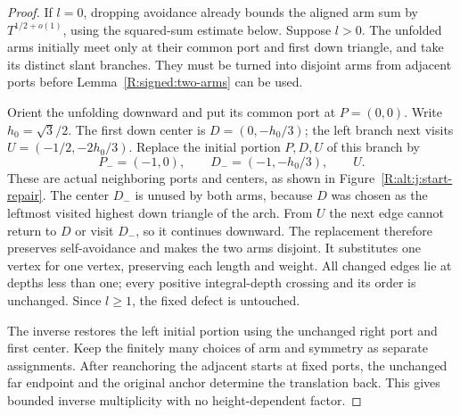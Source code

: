 \begin{proof}
If $l=0$, dropping avoidance already bounds the aligned arm sum by
$T^{1/2+o(1)}$, using the squared-sum estimate below. Suppose $l>0$.
The unfolded arms initially meet only at their common port and first
down triangle, and take its distinct slant branches. They must be turned
into disjoint arms from adjacent ports before Lemma~\ref{R:signed:two-arms}
can be used.

Orient the unfolding downward and put its common port at $P=(0,0)$.
Write $h_0=\sqrt3/2$. The first down center is $D=(0,-h_0/3)$;
the left branch next visits $U=(-1/2,-2h_0/3)$. Replace the initial
portion $P,D,U$ of this branch by
\[
 P_-=(-1,0),\qquad D_-=(-1,-h_0/3),\qquad U.
\]
These are actual neighboring ports and centers, as shown in
Figure~\ref{R:alt:j:start-repair}. The center $D_-$ is unused by both
arms, because $D$ was chosen as the leftmost visited highest down
triangle of the arch. From $U$ the next edge cannot return to $D$ or
visit $D_-$, so it continues downward. The replacement therefore preserves
self-avoidance and makes the two arms disjoint. It substitutes one vertex
for one vertex, preserving each length and weight. All changed edges lie
at depths less than one; every positive integral-depth crossing and its
order is unchanged. Since $l\ge1$, the fixed defect is untouched.

The inverse restores the left initial portion using the unchanged right
port and first center. Keep the finitely many choices of arm and symmetry
as separate assignments. After reanchoring the adjacent starts at fixed
ports, the unchanged far endpoint and the original anchor determine the
translation back. This gives bounded inverse multiplicity with no
height-dependent factor.


\end{proof}
